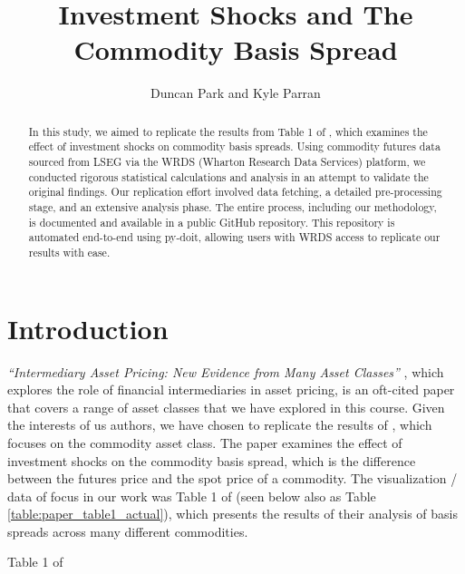 \documentclass[12pt]{article}
\begin{document}
\title{
Investment Shocks and The Commodity Basis Spread}


\author{Duncan Park and Kyle Parran}
\begin{titlepage}
\maketitle


\begin{abstract}
In this study, we aimed to replicate the results from Table 1 of \cite{Yang2013}, which examines the effect of investment shocks on commodity basis spreads.
Using commodity futures data sourced from LSEG via the WRDS (Wharton Research Data Services) platform, we conducted rigorous statistical calculations and analysis in an attempt to validate the original findings.
Our replication effort involved data fetching, a detailed pre-processing stage, and an extensive analysis phase.
The entire process, including our methodology, is documented and available in a public GitHub repository.
This repository is automated end-to-end using py-doit, allowing users with WRDS access to replicate our results with ease.
\end{abstract}

\end{titlepage}

\section{Introduction}
\textit{``Intermediary Asset Pricing: New Evidence from Many Asset Classes''} \cite{He2017}, which explores the role of financial intermediaries in asset pricing, is an oft-cited paper that covers a range of asset classes that we have explored in this course.
Given the interests of us authors, we have chosen to replicate the results of \cite{Yang2013}, which focuses on the commodity asset class.
The paper examines the effect of investment shocks on the commodity basis spread, which is the difference between the futures price and the spot price of a commodity.
The visualization / data of focus in our work was Table 1 of \cite{Yang2013} (seen below also as Table \ref{table:paper_table1_actual}), which presents the results of their analysis of basis spreads across many different commodities.

\newpage

\begin{table}[ht!]
  
  \caption{Table 1 of \cite{Yang2013}}
  \label{table:paper_table1_actual}
\end{table}
\end{document}
